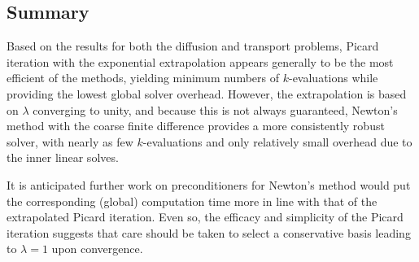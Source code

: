 \subsection{Summary}

Based on the results for both the diffusion and transport problems, Picard 
iteration with the exponential extrapolation appears generally to be the most
efficient of the methods, yielding minimum numbers of $k$-evaluations 
while providing the lowest global solver overhead.  However, the 
extrapolation is based on $\lambda$ converging to unity, and because this 
is not always guaranteed, Newton's method with the coarse finite difference 
provides a more consistently robust solver, with nearly as 
few $k$-evaluations and only relatively small overhead due to the 
inner linear solves.

It is anticipated further work on preconditioners for Newton's method 
would put the corresponding (global) computation time more in line with 
that of the extrapolated Picard iteration.  Even so, the efficacy and 
simplicity of the Picard iteration suggests that care should be taken to 
select a conservative basis leading to $\lambda = 1$ upon convergence.

